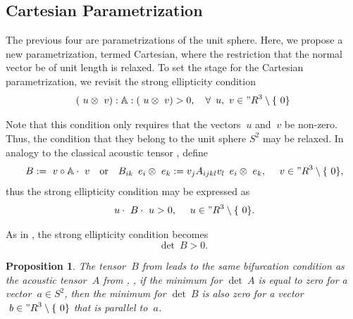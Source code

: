 \documentclass[12pt]{article}
\newtheorem{proposition}{Proposition}
\numberwithin{equation}{section}
\begin{document}
\subsection{Cartesian Parametrization}
\label{subsec:Cartesian}

The previous four are parametrizations of the unit sphere. Here, we
propose a new parametrization, termed Cartesian, where the restriction
that the normal vector be of unit length is relaxed.  To set the stage
for the Cartesian parametrization, we revisit the strong ellipticity
condition
\begin{equation}
  (~u \otimes ~v) : \mathbb{A} : (~u \otimes ~v) > 0,
  \quad
  \forall \, ~u, ~v \in {"R}^3 \setminus \{~0\}
\end{equation}

Note that this condition only requires that the vectors $~u$ and $~v
$ be non-zero. Thus, the condition that they belong to the unit sphere
$S^2$ may be relaxed. In analogy to the classical acoustic tensor
, define
\begin{equation} \label{eq:Cartesian-acoustic-tensor}
  ~B := ~v \circ \mathbb{A} \cdot ~v
  \quad \text{or} \quad
  B_{ik} \, ~e_i \otimes ~e_k := v_j A_{ijkl} v_l  \, ~e_i \otimes ~e_k,
  \quad
  ~v \in {"R}^3 \setminus \{~0\},
\end{equation}
thus the strong ellipticity condition may be expressed as
\begin{equation} \label{eq:Cartesian-acoustic-ellipticity}
  ~u \cdot ~B \cdot ~u > 0,
  \quad
  ~u \in {"R}^3 \setminus \{~0\}.
\end{equation}

As in , the strong ellipticity
condition becomes
\begin{equation} \label{Cartesian-acoustic-determinant}
  \det ~B > 0.
\end{equation}

\begin{proposition}
  The tensor $~B$ from  leads to
  the same bifurcation condition as the acoustic tensor $~A$ from
  , \ie, if the minimum for $\det ~A$ is
  equal to zero for a vector $~a \in S^2$, then the minimum for $\det
  ~B$ is also zero for a vector $~b \in {"R}^3 \setminus \{~0\}$ that
  is parallel to $~a$.
\end{proposition}
\end{document}
